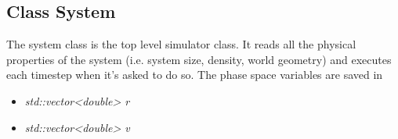 \subsection{Class System}
The system class is the top level simulator class. It reads all the physical properties of the system (i.e. system size, density, world geometry) and executes each timestep when it's asked to do so. The phase space variables are saved in 
\begin{itemize}
\item \textit{std::vector<double> r}
\item \textit{std::vector<double> v}
\end{itemize}